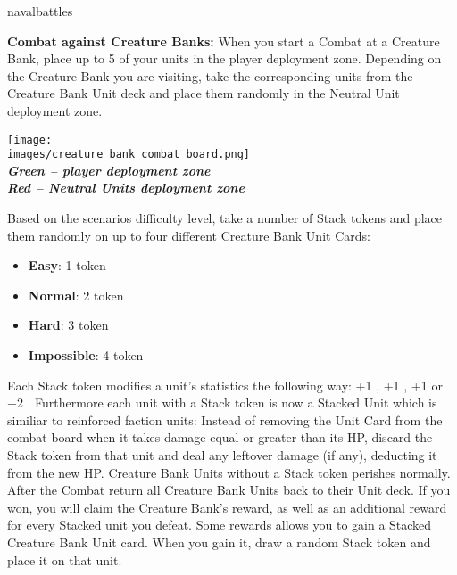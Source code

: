 \begin{expansion}[before=\vspace*{-11mm}]{navalbattles}
\begin{multicols*}{2}
  \textbf{Combat against Creature Banks:} When you start a Combat at a Creature Bank, place up to 5 of your units in the player deployment zone.
  Depending on the Creature Bank you are visiting, take the corresponding units from the Creature Bank Unit deck and place them randomly in the Neutral Unit deployment zone.

  \bigskip
  \begin{center}
    \texttt{[image: \\images/creature\_bank\_combat\_board.png]}\\
    \textbf{\footnotesize\textit{\textcolor{darkcandyapplered}{Green -- player deployment zone}}}\\
    \textbf{\footnotesize\textit{\textcolor{darkcandyapplered}{Red -- Neutral Units deployment zone}}}\\
  \end{center}
  \bigskip

  Based on the scenarios difficulty level, take a number of Stack tokens and place them randomly on up to four different Creature Bank Unit Cards:
  \begin{itemize}
    \item \textbf{Easy}: 1 token
    \item \textbf{Normal}: 2 token
    \item \textbf{Hard}: 3 token
    \item \textbf{Impossible}: 4 token
  \end{itemize}

  Each Stack token modifies a unit's statistics the following way: +1 , +1 , +1  or +2 .
  Furthermore each unit with a Stack token is now a Stacked Unit which is similiar to reinforced faction units: Instead of removing the Unit Card from the combat board when it takes damage equal or greater than its HP, discard the Stack token from that unit and deal any leftover damage (if any), deducting it from the new HP.
  Creature Bank Units without a Stack token perishes normally.
  After the Combat return all Creature Bank Units back to their Unit deck.
  If you won, you will claim the Creature Bank's reward, as well as an additional reward for every Stacked unit you defeat.
  Some rewards allows you to gain a Stacked Creature Bank Unit card.
  When you gain it, draw a random Stack token and place it on that unit.
  \end{multicols*}
\end{expansion}
